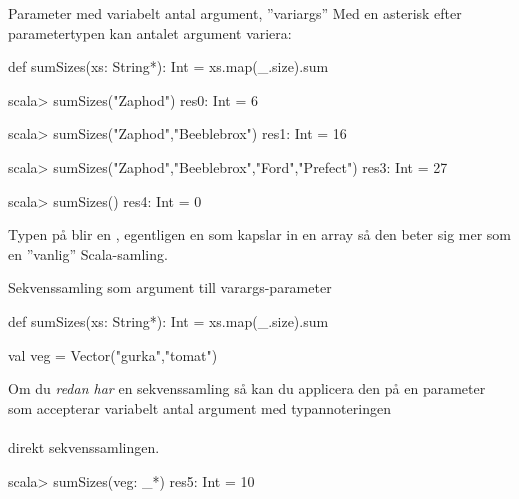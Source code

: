 

\ifkompendium\else

\SlideFontSmall

\begin{Slide}{Parameter med variabelt antal argument, ''variargs''}
Med en asterisk efter parametertypen kan antalet argument variera:
\begin{Code}[basicstyle=\fontsize{10}{12}\selectfont\ttfamily]
def sumSizes(xs: String*): Int = xs.map(_.size).sum
\end{Code}
\begin{REPLnonum}
scala> sumSizes("Zaphod")
res0: Int = 6

scala> sumSizes("Zaphod","Beeblebrox")
res1: Int = 16

scala> sumSizes("Zaphod","Beeblebrox","Ford","Prefect")
res3: Int = 27

scala> sumSizes()
res4: Int = 0
\end{REPLnonum}
Typen på  blir en , egentligen en  som kapslar in en array så den beter sig mer som en ''vanlig'' Scala-samling.
\end{Slide}

\begin{Slide}{Sekvenssamling som argument till varargs-parameter}
\begin{Code}[basicstyle=\fontsize{10}{12}\selectfont\ttfamily]
def sumSizes(xs: String*): Int = xs.map(_.size).sum

val veg = Vector("gurka","tomat")
\end{Code}
Om du \emph{redan har} en sekvenssamling så kan du applicera den på en parameter som accepterar variabelt antal argument med typannoteringen \\ {\vspace{1em}\Large\code{: _* }} \\ \vspace{1em}direkt  sekvenssamlingen.
\begin{REPLnonum}
scala> sumSizes(veg: _*)
res5: Int = 10
\end{REPLnonum}

\end{Slide}

\fi







